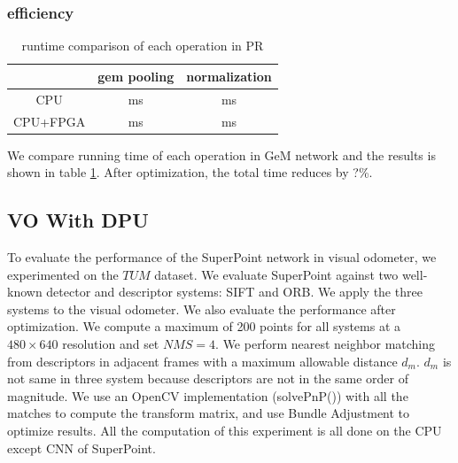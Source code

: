 \subsubsection{efficiency}

\begin{table}
    \label{tab:gem_eff}
    \centering 
    \caption{runtime comparison of each operation in PR}
    \begin{tabular}{|c|c|c|}
				\hline
              & gem pooling & normalization \\
        \hline
        CPU   &   ms &   ms \\
        \hline
        CPU+FPGA &   ms &   ms \\
			  \hline
    \end{tabular}
  \end{table}

We compare running time of each operation in GeM network and the results is shown in table \ref{tab:gem_eff}. After optimization, the total time reduces by ?\%.


\subsection{ VO With DPU }

To evaluate the performance of the SuperPoint network in visual odometer, we experimented on the $TUM$ dataset. We evaluate SuperPoint against two well-known detector and descriptor systems: SIFT\cite{Lowe-478} and ORB\cite{RubleeRabaud-479}. We apply the three systems to the visual odometer. We also evaluate the performance after optimization. We compute a maximum of 200 points for all systems at a $480\times640$ resolution and set $NMS=4$. We perform nearest neighbor matching from descriptors in adjacent frames with a maximum allowable distance $d_m$. $d_m$ is not same in three system because descriptors are not in the same order of magnitude. We use an OpenCV implementation (solvePnP()) with all the matches to compute the transform matrix, and use Bundle Adjustment to optimize results. All the computation of this experiment is all done on the CPU except CNN of SuperPoint. 


